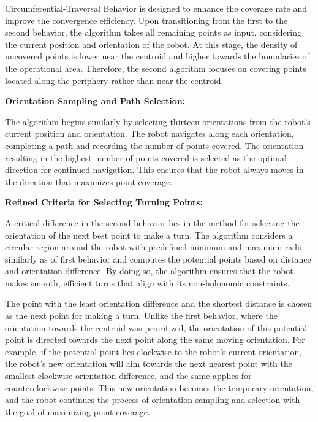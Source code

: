 Circumferential-Traversal Behavior is designed to enhance the coverage rate and improve the convergence efficiency. Upon transitioning from the first to the second behavior, the algorithm takes all remaining points as input, considering the current position and orientation of the robot. At this stage, the density of uncovered points is lower near the centroid and higher towards the boundaries of the operational area. Therefore, the second algorithm focuses on covering points located along the periphery rather than near the centroid.

\vspace{3mm}   

\textbf{Orientation Sampling and Path Selection:}

The algorithm begins similarly by selecting thirteen orientations from the robot's current position and orientation. The robot navigates along each orientation, completing a path and recording the number of points covered. The orientation resulting in the highest number of points covered is selected as the optimal direction for continued navigation. This ensures that the robot always moves in the direction that maximizes point coverage.

\vspace{3mm}   

\textbf{Refined Criteria for Selecting Turning Points:}

A critical difference in the second behavior lies in the method for selecting the orientation of the next best point to make a turn. The algorithm considers a circular region around the robot with predefined minimum and maximum radii similarly as of first behavior and computes the potential points based on distance and orientation difference. By doing so, the algorithm ensures that the robot makes smooth, efficient turns that align with its non-holonomic constraints.

\vspace{3mm}   

The point with the least orientation difference and the shortest distance is chosen as the next point for making a turn. Unlike the first behavior, where the orientation towards the centroid was prioritized, the orientation of this potential point is directed towards the next point along the same moving orientation. For example, if the potential point lies clockwise to the robot's current orientation, the robot's new orientation will aim towards the next nearest point with the smallest clockwise orientation difference, and the same applies for counterclockwise points. This new orientation becomes the temporary orientation, and the robot continues the process of orientation sampling and selection with the goal of maximizing point coverage.

